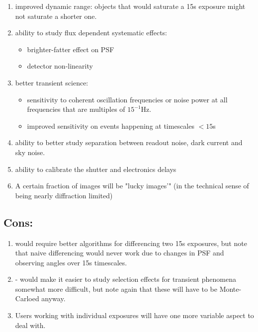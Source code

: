 \documentclass[12pt, a4paper]{article}
\begin{document}
\begin{enumerate}
\item improved dynamic range: objects that would saturate a 15s
  exposure might not saturate a shorter one.

\item ability to study flux dependent systematic effects:
  \begin{itemize}
  \item brighter-fatter effect on PSF
  \item detector non-linearity
  \end{itemize}

\item better transient science:
  \begin{itemize}
  \item sensitivity to coherent oscillation frequencies or noise power at all
    frequencies that are multiples  of $15^{-1}$Hz.
  \item improved sensitivity on events happening at timescales $<15$s 
  \end{itemize}

\item ability to better study separation between readout noise, dark
  current and sky noise. 

\item ability to calibrate the shutter and electronics delays

\item A certain fraction of images will be "lucky images'" (in the
  technical sense of being nearly diffraction limited)

\end{enumerate}

\subsection*{Cons:}

\begin{enumerate}
\item would require better algorithms for differencing two 15s
  exposures, but note that naive differencing would never work due to
  changes in PSF and observing angles over 15s timescales.

\item - would make it easier to study selection effects for transient
  phenomena somewhat more difficult, but note again that these will
  have to be Monte-Carloed anyway.

\item Users working with individual exposures will have one more
  variable aspect to deal with.

\end{enumerate}
\end{document}
